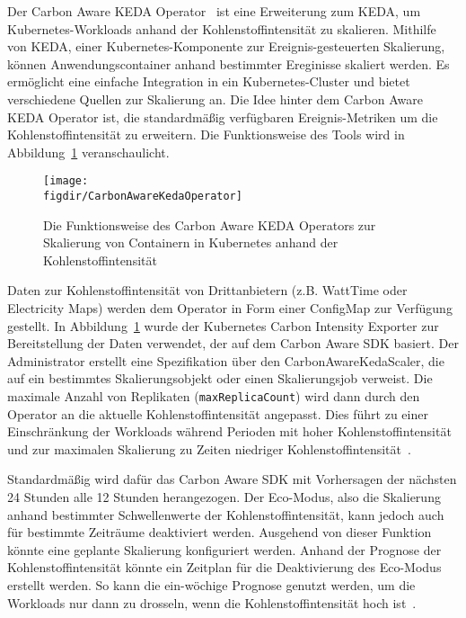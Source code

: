 \noindent Der Carbon Aware KEDA Operator~\cite{Azure.20240321T11:03:47.000Z} ist eine Erweiterung zum \ac{KEDA}, um Kubernetes-Workloads anhand der Kohlenstoffintensität zu skalieren.
Mithilfe von \ac{KEDA}, einer Kubernetes-Komponente zur Ereignis-gesteuerten Skalierung, können Anwendungscontainer anhand bestimmter Ereginisse skaliert werden.
Es ermöglicht eine einfache Integration in ein Kubernetes-Cluster und bietet verschiedene Quellen zur Skalierung an.
Die Idee hinter dem Carbon Aware \ac{KEDA} Operator ist, die standardmäßig verfügbaren Ereignis-Metriken um die Kohlenstoffintensität zu erweitern.
Die Funktionsweise des Tools wird in Abbildung~\ref{FIG:carbon-aware-keda-operator} veranschaulicht.
\begin{figure}
 \caption[Funktionsweise Carbon Aware KEDA Operator]{Die Funktionsweise des Carbon Aware KEDA Operators zur Skalierung von Containern in Kubernetes anhand der Kohlenstoffintensität~\cite{Azure.20240321T11:03:47.000Z}}
 {\texttt{[image: \\figdir/CarbonAwareKedaOperator]}}
 \label{FIG:carbon-aware-keda-operator}
\end{figure}
Daten zur Kohlenstoffintensität von Drittanbietern (z.B. WattTime oder Electricity Maps) werden dem Operator in Form einer ConfigMap zur Verfügung gestellt.
In Abbildung~\ref{FIG:carbon-aware-keda-operator} wurde der Kubernetes Carbon Intensity Exporter zur Bereitstellung der Daten verwendet, der auf dem Carbon Aware \ac{SDK} basiert.
Der Administrator erstellt eine Spezifikation über den CarbonAwareKedaScaler, die auf ein bestimmtes Skalierungsobjekt oder einen Skalierungsjob verweist.
Die maximale Anzahl von Replikaten (\lstinline[columns=fixed]{maxReplicaCount}) wird dann durch den Operator an die aktuelle Kohlenstoffintensität angepasst.
Dies führt zu einer Einschränkung der Workloads während Perioden mit hoher Kohlenstoffintensität und zur maximalen Skalierung zu Zeiten niedriger Kohlenstoffintensität~\cite{Azure.20240321T11:03:47.000Z}.

Standardmäßig wird dafür das Carbon Aware SDK mit Vorhersagen der nächsten 24 Stunden alle 12 Stunden herangezogen.
Der Eco-Modus, also die Skalierung anhand bestimmter Schwellenwerte der Kohlenstoffintensität, kann jedoch auch für bestimmte Zeiträume deaktiviert werden.
Ausgehend von dieser Funktion könnte eine geplante Skalierung konfiguriert werden.
Anhand der Prognose der Kohlenstoffintensität könnte ein Zeitplan für die Deaktivierung des Eco-Modus erstellt werden.
So kann die ein-wöchige Prognose genutzt werden, um die Workloads nur dann zu drosseln, wenn die Kohlenstoffintensität hoch ist~\cite{Azure.20240321T11:03:47.000Z}.


